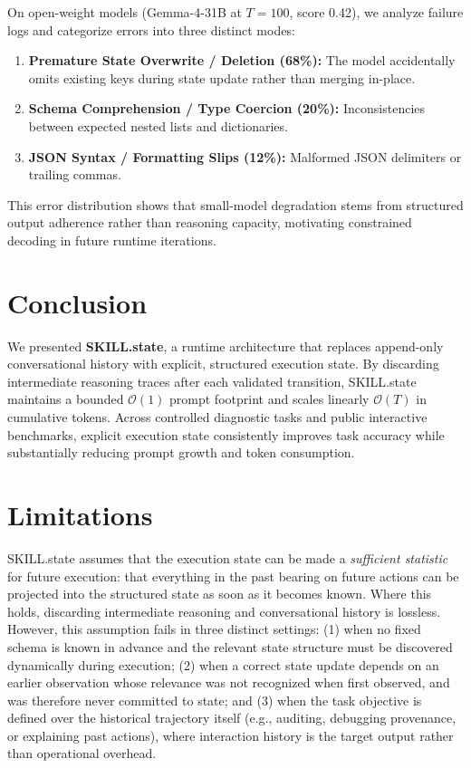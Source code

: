 \documentclass[11pt]{article}
\begin{document}
On open-weight models (Gemma-4-31B at $T=100$, score 0.42), we analyze failure logs and categorize errors into three distinct modes:
\begin{enumerate}[leftmargin=*]
    \item \textbf{Premature State Overwrite / Deletion (68\%):} The model accidentally omits existing keys during state update rather than merging in-place.
    \item \textbf{Schema Comprehension / Type Coercion (20\%):} Inconsistencies between expected nested lists and dictionaries.
    \item \textbf{JSON Syntax / Formatting Slips (12\%):} Malformed JSON delimiters or trailing commas.
\end{enumerate}
This error distribution shows that small-model degradation stems from structured output adherence rather than reasoning capacity, motivating constrained decoding in future runtime iterations.

\section{Conclusion}

We presented \textbf{SKILL.state}, a runtime architecture that replaces append-only conversational history with explicit, structured execution state. By discarding intermediate reasoning traces after each validated transition, SKILL.state maintains a bounded $\mathcal{O}(1)$ prompt footprint and scales linearly $\mathcal{O}(T)$ in cumulative tokens. Across controlled diagnostic tasks and public interactive benchmarks, explicit execution state consistently improves task accuracy while substantially reducing prompt growth and token consumption.

\section{Limitations}
\label{sec:limitations}

SKILL.state assumes that the execution state can be made a \emph{sufficient statistic} for future execution: that everything in the past bearing on future actions can be projected into the structured state as soon as it becomes known. Where this holds, discarding intermediate reasoning and conversational history is lossless. However, this assumption fails in three distinct settings: (1) when no fixed schema is known in advance and the relevant state structure must be discovered dynamically during execution; (2) when a correct state update depends on an earlier observation whose relevance was not recognized when first observed, and was therefore never committed to state; and (3) when the task objective is defined over the historical trajectory itself (e.g., auditing, debugging provenance, or explaining past actions), where interaction history is the target output rather than operational overhead.
\end{document}
